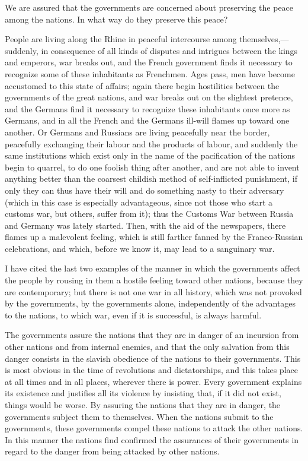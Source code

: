 \documentclass{book}
\begin{document}
We are assured that the governments are concerned about preserving the peace among the nations. In what way do they preserve this peace?

People are living along the Rhine in peaceful intercourse among themselves,—suddenly, in consequence of all kinds of disputes and intrigues between the kings and emperors, war breaks out, and the French government finds it necessary to recognize some of these inhabitants as Frenchmen. Ages pass, men have become accustomed to this state of affairs; again there begin hostilities between the governments of the great nations, and war breaks out on the slightest pretence, and the Germans find it necessary to recognize these inhabitants once more as Germans, and in all the French and the Germans ill-will flames up toward one another. Or Germans and Russians are living peacefully near the border, peacefully exchanging their labour and the products of labour, and suddenly the same institutions which exist only in the name of the pacification of the nations begin to quarrel, to do one foolish thing after another, and are not able to invent anything better than the coarsest childish method of self-inflicted punishment, if only they can thus have their will and do something nasty to their adversary (which in this case is especially advantageous, since not those who start a customs war, but others, suffer from it); thus the Customs War between Russia and Germany was lately started. Then, with the aid of the newspapers, there flames up a malevolent feeling, which is still farther fanned by the Franco-Russian celebrations, and which, before we know it, may lead to a sanguinary war.

I have cited the last two examples of the manner in which the governments affect the people by rousing in them a hostile feeling toward other nations, because they are contemporary; but there is not one war in all history, which was not provoked by the governments, by the governments alone, independently of the advantages to the nations, to which war, even if it is successful, is always harmful.

The governments assure the nations that they are in danger of an incursion from other nations and from internal enemies, and that the only salvation from this danger consists in the slavish obedience of the nations to their governments. This is most obvious in the time of revolutions and dictatorships, and this takes place at all times and in all places, wherever there is power. Every government explains its existence and justifies all its violence by insisting that, if it did not exist, things would be worse. By assuring the nations that they are in danger, the governments subject them to themselves. When the nations submit to the governments, these governments compel these nations to attack the other nations. In this manner the nations find confirmed the assurances of their governments in regard to the danger from being attacked by other nations.
\end{document}

